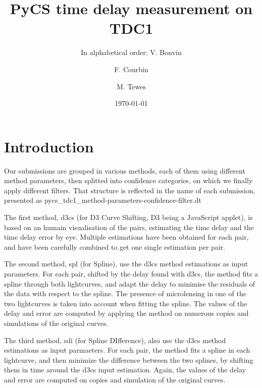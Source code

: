\documentclass[traditabstract]{aa}
\begin{document}
\title{PyCS time delay measurement on TDC1}
\author{ In alphabetical order:
V. Bonvin\inst{\ref{epfl}} \and
F. Courbin\inst{\ref{epfl}} \and
M. Tewes\inst{\ref{bonn}}
}


\date{\today}

\maketitle

\section{Introduction}


Our submissions are grouped in various methods, each of them using different method parameters, then splitted into confidence categories, on which we finally apply different filters. That structure is reflected in the name of each submission, presented as pycs\_tdc1\_method-parameters-confidence-filter.dt

The first method, d3cs (for D3 Curve Shifting, D3 being a JavaScript applet), is based on an humain visualisation of the pairs, estimating the time delay and the time delay error by eye. Multiple estimations have been obtained for each pair, and have been carefully combined to get one single estimation per pair.

The second method, spl (for Spline), use the d3cs method estimations as input parameters. For each pair, shifted by the delay found with d3cs, the method fits a spline through both lightcurves, and adapt the delay to minimise the residuals of the data with respect to the spline. The presence of microlensing in one of the two lightcurves is taken into account when fitting the spline. The values of the delay and error are computed by applying the method on numerous copies and simulations of the original curves.

The third method, sdi (for Spline DIfference), also use the d3cs method estimations as input parmaeters. For each pair, the method fits a spline in each lightcurve, and then minimize the difference between the two splines, by shifting them in time around the d3cs input estimation. Again, the values of the delay and error are computed on copies and simulation of the original curves.

\citep{pycs}




\end{document}
